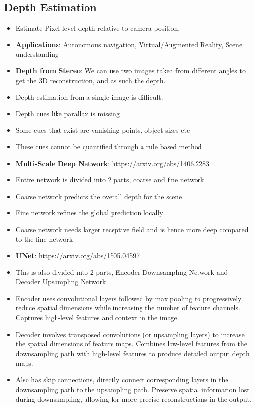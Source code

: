 \documentclass[a4paper]{article}
\begin{document}
\subsection{Depth Estimation}
\begin{itemize}
    \item Estimate Pixel-level depth relative to camera position.
    \item \textbf{Applications}: Autonomous navigation, Virtual/Augmented Reality, Scene understanding
    \item \textbf{Depth from Stereo}: We can use two images taken from different angles to get the 3D reconstruction, and as such the depth.
    \item Depth estimation from a single image is difficult.
    \item Depth cues like parallax is missing
    \item Some cues that exist are vanishing points, object sizes etc
    \item These cues cannot be quantified through a rule based method
    \item \textbf{Multi-Scale Deep Network}: \url{https://arxiv.org/abs/1406.2283}
    \item Entire network is divided into 2 parts, coarse and fine network.
    \item Coarse network predicts the overall depth for the scene
    \item Fine network refines the global prediction locally
    \item Coarse network needs larger receptive field and is hence more deep compared to the fine network
    \item \textbf{UNet}: \url{https://arxiv.org/abs/1505.04597}
    \item This is also divided into 2 parts, Encoder Downsampling Network and Decoder Upsampling Network
    \item Encoder uses convolutional layers followed by max pooling to progressively reduce spatial dimensions while increasing the number of feature channels. Captures high-level features and context in the image.
    \item Decoder involves transposed convolutions (or upsampling layers) to increase the spatial dimensions of feature maps. Combines low-level features from the downsampling path with high-level features to produce detailed output depth maps.
    \item Also has skip connections, directly connect corresponding layers in the downsampling path to the upsampling path. Preserve spatial information lost during downsampling, allowing for more precise reconstructions in the output.

\end{itemize}
\end{document}
